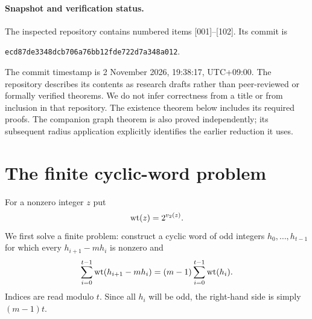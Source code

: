 \documentclass[11pt,a4paper]{article}
\theoremstyle{definition}\newtheorem{definition}[theorem]{Definition}
\theoremstyle{remark}\newtheorem{remark}[theorem]{Remark}
\begin{document}
\paragraph{Snapshot and verification status.}
The inspected repository contains numbered items [001]--[102]. Its
commit is
\begin{center}\small\texttt{ecd87de3348dcb706a76bb12fde722d7a348a012}.\end{center}
The commit timestamp is 2 November 2026, 19:38:17, UTC+09:00.
The repository describes its contents as research drafts rather than
peer-reviewed or formally verified theorems. We do not infer correctness
from a title or from inclusion in that repository. The existence theorem
below includes its required proofs. The companion graph theorem is also
proved independently; its subsequent radius application explicitly
identifies the earlier reduction it uses.

\section{The finite cyclic-word problem}
For a nonzero integer $z$ put
\[
 \operatorname{wt}(z)=2^{v_2(z)}.
\]
We first solve a finite problem: construct a cyclic word of odd integers
$h_0,\ldots,h_{t-1}$ for which every $h_{i+1}-mh_i$ is nonzero and
\begin{equation}\label{eq:wordbudget}
 \sum_{i=0}^{t-1}\operatorname{wt}(h_{i+1}-mh_i)
       =(m-1)\sum_{i=0}^{t-1}\operatorname{wt}(h_i).
\end{equation}
Indices are read modulo $t$. Since all $h_i$ will be odd, the right-hand
side is simply $(m-1)t$.
\end{document}
